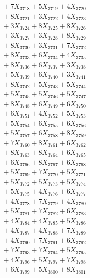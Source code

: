 \documentclass[a4paper,10pt]{article}
\begin{document}
{\begin{align}
&\;  + 7 X_{3718} + 5 X_{3719} + 4 X_{3720} \\[0.3ex]
&\;  + 8 X_{3721} + 3 X_{3722} + 4 X_{3723} \\[0.3ex]
&\;  + 3 X_{3724} + 8 X_{3725} + 8 X_{3726} \\[0.3ex]
&\;  + 3 X_{3727} + 3 X_{3728} + 8 X_{3729} \\[0.5ex]\allowbreak
&\;  + 8 X_{3730} + 3 X_{3731} + 7 X_{3732} \\[0.3ex]
&\;  + 8 X_{3733} + 6 X_{3734} + 4 X_{3735} \\[0.3ex]
&\;  + 8 X_{3736} + 6 X_{3737} + 3 X_{3738} \\[0.3ex]
&\;  + 5 X_{3739} + 6 X_{3740} + 3 X_{3741} \\[0.3ex]
&\;  + 8 X_{3742} + 5 X_{3743} + 5 X_{3744} \\[0.3ex]
&\;  + 5 X_{3745} + 5 X_{3746} + 5 X_{3747} \\[0.3ex]
&\;  + 8 X_{3748} + 6 X_{3749} + 6 X_{3750} \\[0.3ex]
&\;  + 6 X_{3751} + 4 X_{3752} + 5 X_{3753} \\[0.3ex]
&\;  + 5 X_{3754} + 6 X_{3755} + 6 X_{3756} \\[0.3ex]
&\;  + 5 X_{3757} + 6 X_{3758} + 8 X_{3759} \\[0.5ex]\allowbreak
&\;  + 7 X_{3760} + 8 X_{3761} + 6 X_{3762} \\[0.3ex]
&\;  + 8 X_{3763} + 8 X_{3764} + 6 X_{3765} \\[0.3ex]
&\;  + 6 X_{3766} + 8 X_{3767} + 6 X_{3768} \\[0.3ex]
&\;  + 5 X_{3769} + 7 X_{3770} + 5 X_{3771} \\[0.3ex]
&\;  + 5 X_{3772} + 5 X_{3773} + 5 X_{3774} \\[0.3ex]
&\;  + 5 X_{3775} + 4 X_{3776} + 6 X_{3777} \\[0.3ex]
&\;  + 4 X_{3778} + 7 X_{3779} + 4 X_{3780} \\[0.3ex]
&\;  + 5 X_{3781} + 7 X_{3782} + 6 X_{3783} \\[0.3ex]
&\;  + 4 X_{3784} + 4 X_{3785} + 5 X_{3786} \\[0.3ex]
&\;  + 4 X_{3787} + 4 X_{3788} + 7 X_{3789} \\[0.5ex]\allowbreak
&\;  + 4 X_{3790} + 7 X_{3791} + 6 X_{3792} \\[0.3ex]
&\;  + 7 X_{3793} + 7 X_{3794} + 5 X_{3795} \\[0.3ex]
&\;  + 4 X_{3796} + 5 X_{3797} + 7 X_{3798} \\[0.3ex]
&\;  + 6 X_{3799} + 5 X_{3800} + 8 X_{3801} \\[0.3ex]

\end{align}}
\end{document}
